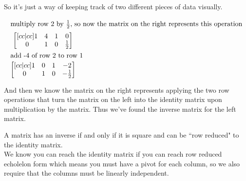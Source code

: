 \documentclass[11pt]{book}
\begin{document}
So it's just a way of keeping track of two different pieces of data visually.

\begin{gather*}
    \intertext{multiply row 2 by $\frac{1}{2}$, so now the matrix on the right represents this operation}
    \begin{bmatrix}[c c | c c]
    	1 & 4 & 1 & 0 \\
    	0 & 1 & 0 & \frac{1}{2} 
    \end{bmatrix}\\
    \intertext{add -4 of row 2 to row 1}
    \begin{bmatrix}[c c | c c]
    	1 & 0 & 1 & -2 \\
    	0 & 1 & 0 & -\frac{1}{2} 
    \end{bmatrix}
\end{gather*}

And then we know the matrix on the right represents applying the two row operations that turn the matrix on the left into the identity matrix upon multiplication by the matrix. Thus we've found the inverse matrix for the left matrix.

\begin{thm}\label{thm:inverse_existance}
    A matrix has an inverse if and only if it is square and can be ``row reduced" to the identity matrix.\\
    We know you can reach the identity matrix if you can reach row reduced echolelon form which means you must have a pivot for each column, so we also require that the columns must be linearly independent.
\end{thm}


\end{document}
